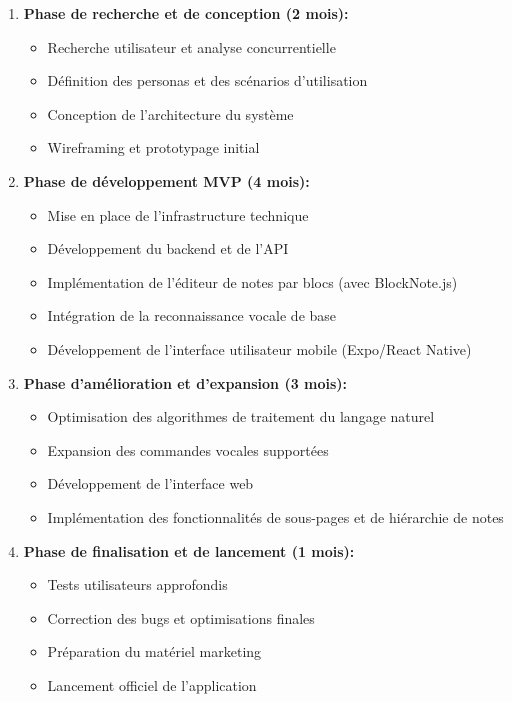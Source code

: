     \begin{enumerate}
        \item \textbf{Phase de recherche et de conception (2 mois):}
        \begin{itemize}
            \item Recherche utilisateur et analyse concurrentielle
            \item Définition des personas et des scénarios d'utilisation
            \item Conception de l'architecture du système
            \item Wireframing et prototypage initial
        \end{itemize}
        
        \item \textbf{Phase de développement MVP (4 mois):}
        \begin{itemize}
            \item Mise en place de l'infrastructure technique
            \item Développement du backend et de l'API
            \item Implémentation de l'éditeur de notes par blocs (avec BlockNote.js)
            \item Intégration de la reconnaissance vocale de base
            \item Développement de l'interface utilisateur mobile (Expo/React Native)
        \end{itemize}
        
        \item \textbf{Phase d'amélioration et d'expansion (3 mois):}
        \begin{itemize}
            \item Optimisation des algorithmes de traitement du langage naturel
            \item Expansion des commandes vocales supportées
            \item Développement de l'interface web
            \item Implémentation des fonctionnalités de sous-pages et de hiérarchie de notes
        \end{itemize}
        
        \item \textbf{Phase de finalisation et de lancement (1 mois):}
        \begin{itemize}
            \item Tests utilisateurs approfondis
            \item Correction des bugs et optimisations finales
            \item Préparation du matériel marketing
            \item Lancement officiel de l'application
        \end{itemize}
    \end{enumerate}
    

